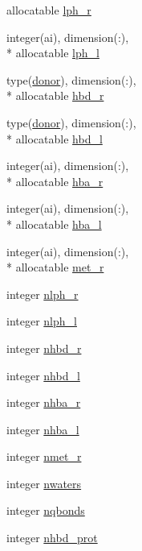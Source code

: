 \begin{DoxyCompactItemize}
allocatable \hyperlink{classcalc__pmf_a3fef19c1e6b623231279e839e8d3488f}{lph\-\_\-r}
\item 
integer(ai), dimension(\-:), \\*
allocatable \hyperlink{classcalc__pmf_a46e29646f71e1615ceac97effe79bf6a}{lph\-\_\-l}
\item 
type(\hyperlink{structcalc__pmf_1_1donor}{donor}), dimension(\-:), \\*
allocatable \hyperlink{classcalc__pmf_a815659caae16f7d11ba50b53fad2ee87}{hbd\-\_\-r}
\item 
type(\hyperlink{structcalc__pmf_1_1donor}{donor}), dimension(\-:), \\*
allocatable \hyperlink{classcalc__pmf_af9825de03053e01cf7ac2ac17545a509}{hbd\-\_\-l}
\item 
integer(ai), dimension(\-:), \\*
allocatable \hyperlink{classcalc__pmf_a72d401bd03d18040c3238d42a07b895c}{hba\-\_\-r}
\item 
integer(ai), dimension(\-:), \\*
allocatable \hyperlink{classcalc__pmf_a977c23a403bfb5eb80a7fefbb104aae5}{hba\-\_\-l}
\item 
integer(ai), dimension(\-:), \\*
allocatable \hyperlink{classcalc__pmf_a66bc38a02eb1454e833ec9e65acc2b5c}{met\-\_\-r}
\item 
integer \hyperlink{classcalc__pmf_a10154c74668f9e5a53a5dad472608a62}{nlph\-\_\-r}
\item 
integer \hyperlink{classcalc__pmf_a4b04a9f317d4dcb45e3d51751fbac115}{nlph\-\_\-l}
\item 
integer \hyperlink{classcalc__pmf_a4e0857a9a7cfd76db79d0a6bd99aa69a}{nhbd\-\_\-r}
\item 
integer \hyperlink{classcalc__pmf_a1b095aceba95c04282323155ee1427af}{nhbd\-\_\-l}
\item 
integer \hyperlink{classcalc__pmf_adca5f880f0ae8019b40b5d900523f009}{nhba\-\_\-r}
\item 
integer \hyperlink{classcalc__pmf_acb89c2967da4f9c0a217cecc08ccf510}{nhba\-\_\-l}
\item 
integer \hyperlink{classcalc__pmf_a323b86d254d89f4f5e9f2f9725209b4f}{nmet\-\_\-r}
\item 
integer \hyperlink{classcalc__pmf_a4232eda1705ffe1f555323f262740595}{nwaters}
\item 
integer \hyperlink{classcalc__pmf_a8a8997db88056a574479b606238ae64b}{nqbonds}
\item 
integer \hyperlink{classcalc__pmf_ac47b0e97a6432e5234f23c7d671f441d}{nhbd\-\_\-prot}

\end{DoxyCompactItemize}
